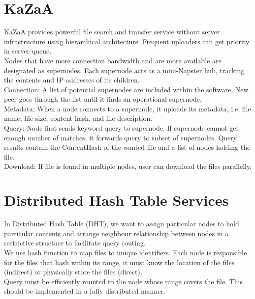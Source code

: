 \begin{multicols*}{2}
\section{KaZaA}

\noindent KaZaA provides powerful file search and transfer service without server infrastructure using hierarchical architecture. Frequent uploaders can get priority in server queue. \\

\noindent Nodes that have more connection bandwidth and are more available are designated as supernodes. Each supernode acts as a mini-Napster hub, tracking the contents and IP addresses of its children. \\

\noindent Connection: A list of potential supernodes are included within the software. New peer goes through the list until it finds an operational supernode.\\

\noindent Metadata: When a node connects to a supernode, it uploads its metadata, i.e. file name, file size, content hash, and file description.\\

\noindent Query: Node first sends keyword query to supernode. If supernode cannot get enough number of matches, it forwards query to subset of supernodes. Query results contain the ContentHash of the wanted file and a list of nodes holding the file.\\

\noindent Download: If file is found in multiple nodes, user can download the files parallelly. 

\section{Distributed Hash Table Services}

\noindent In Distributed Hash Table (DHT), we want to assign particular nodes to hold particular contents and arrange neighbour relationship between nodes in a restrictive structure to facilitate query routing.\\

\noindent We use hash function to map files to unique identifiers. Each node is responsible for the files that hash within its range, it must know the location of the files (indirect) or physically store the files (direct). \\

\noindent Query must be efficiently rounted to the node whose range covers the file. This should be implemented in a fully distributed manner. \\


\end{multicols*}
